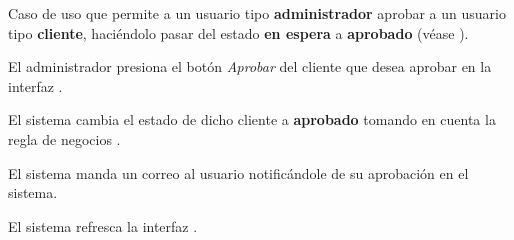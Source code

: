 %
%

{
  Caso de uso que permite a un usuario tipo \textbf{administrador} aprobar a un
  usuario tipo \textbf{cliente}, haciéndolo pasar del estado \textbf{en espera}
  a \textbf{aprobado} (véase ).

  \begin{trayectoriaPrincipal}

    \item El administrador presiona el botón \textit{Aprobar} del cliente que
      desea aprobar en la interfaz .

    \item El sistema cambia el estado de dicho cliente a \textbf{aprobado}
      tomando en cuenta la regla de negocios .

    \item El sistema manda un correo al usuario notificándole de su
      aprobación en el sistema.

    \item El sistema refresca la interfaz .

  \end{trayectoriaPrincipal}
}
